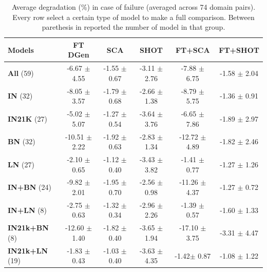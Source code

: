 \documentclass{article}
\begin{document}
\begin{table}[h]
\caption{Average degradation (\%) in case of failure (averaged across 74 domain pairs). Every row select a certain type of model to make a full comparison. Between parethesis in reported the number of model in that group. } 
\vspace{0.5cm}
\label{degradation_avg}
\begin{center}
\begin{footnotesize}
\begin{tabular}{l ccccc}

\toprule
\textbf{Models} & \textbf{FT DGen} &  \textbf{SCA} & \textbf{SHOT} & \textbf{FT+SCA} & \textbf{FT+SHOT} \\
\midrule
\textbf{All} (59) 
& -6.67  \tiny{$\pm$  4.55} 
& -1.55  \tiny{$\pm$ 0.67} 
& -3.11  \tiny{$\pm$ 2.76} 
&  -7.88 \tiny{$\pm$ 6.75} 
& -1.58  \tiny{$\pm$ 2.04}\\
\midrule
\textbf{IN} (32) 
& -8.05  \tiny{$\pm$ 3.57} 
& -1.79  \tiny{$\pm$ 0.68} 
& -2.66  \tiny{$\pm$ 1.38} 
&  -8.79 \tiny{$\pm$ 5.75} 
& -1.36  \tiny{$\pm$ 0.91} \\
\textbf{IN21K} (27) 
& -5.02  \tiny{$\pm$ 5.07} 
& -1.27  \tiny{$\pm$ 0.54} 
& -3.64  \tiny{$\pm$ 3.76} 
&  -6.65 \tiny{$\pm$ 7.86} 
& -1.89  \tiny{$\pm$ 2.97}\\
\midrule
\textbf{BN} (32) 
& -10.51   \tiny{$\pm$ 2.22} 
& -1.92    \tiny{$\pm$ 0.63} 
& -2.83    \tiny{$\pm$ 1.34} 
&  -12.72  \tiny{$\pm$ 4.89} 
& -1.82    \tiny{$\pm$ 2.46} \\
\textbf{LN} (27) 
& -2.10   \tiny{$\pm$ 0.65} 
& -1.12   \tiny{$\pm$ 0.40} 
& -3.43   \tiny{$\pm$ 3.82} 
&  -1.41  \tiny{$\pm$ 0.77} 
& -1.27   \tiny{$\pm$ 1.26} \\
\midrule
\textbf{IN+BN} (24) 
& -9.82    \tiny{$\pm$ 2.01} 
& -1.95    \tiny{$\pm$ 0.70} 
& -2.56    \tiny{$\pm$ 0.98} 
&  -11.26  \tiny{$\pm$ 4.37} 
& -1.27    \tiny{$\pm$ 0.72}\\
\textbf{IN+LN} (8) 
& -2.75  \tiny{$\pm$ 0.63} 
& -1.32  \tiny{$\pm$ 0.34} 
& -2.96  \tiny{$\pm$ 2.26} 
&  -1.39 \tiny{$\pm$ 0.57} 
& -1.60  \tiny{$\pm$ 1.33} \\
\midrule
\textbf{IN21k+BN} (8) 
& -12.60  \tiny{$\pm$ 1.40} 
& -1.82   \tiny{$\pm$ 0.40} 
& -3.65   \tiny{$\pm$ 1.94} 
&  -17.10 \tiny{$\pm$ 3.75} 
& -3.31   \tiny{$\pm$ 4.47}\\
\textbf{IN21k+LN} (19) 
& -1.83 \tiny{$\pm$ 0.43} 
& -1.03 \tiny{$\pm$ 0.40} 
& -3.63 \tiny{$\pm$ 4.35} 
&  -1.42\tiny{$\pm$ 0.87} 
& -1.08 \tiny{$\pm$ 1.22} \\
\bottomrule

\end{tabular}
\end{footnotesize}
\end{center}
\end{table}
\end{document}
